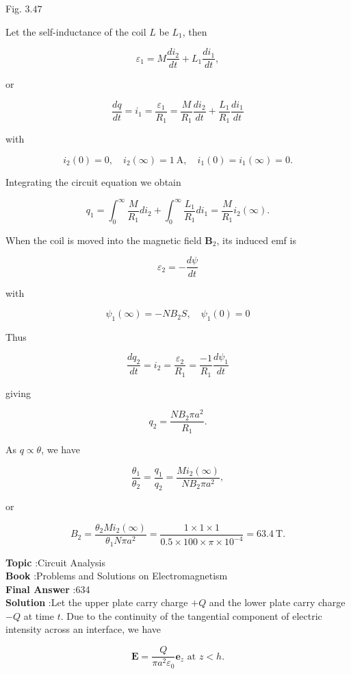 \documentclass[10pt]{article}
\begin{document}
Fig. $3.47$

Let the self-inductance of the coil $L$ be $L_{1}$, then

$$
\varepsilon_{1}=M \frac{d i_{2}}{d t}+L_{1} \frac{d i_{1}}{d t},
$$

or

$$
\frac{d q}{d t}=i_{1}=\frac{\varepsilon_{1}}{R_{1}}=\frac{M}{R_{1}} \frac{d i_{2}}{d t}+\frac{L_{1}}{R_{1}} \frac{d i_{1}}{d t}
$$

with

$$
i_{2}(0)=0, \quad i_{2}(\infty)=1 \mathrm{~A}, \quad i_{1}(0)=i_{1}(\infty)=0 .
$$

Integrating the circuit equation we obtain

$$
q_{1}=\int_{0}^{\infty} \frac{M}{R_{1}} d i_{2}+\int_{0}^{\infty} \frac{L_{1}}{R_{1}} d i_{1}=\frac{M}{R_{1}} i_{2}(\infty) .
$$

When the coil is moved into the magnetic field $\mathbf{B}_{2}$, its induced emf is

$$
\varepsilon_{2}=-\frac{d \psi}{d t}
$$

with

$$
\psi_{1}(\infty)=-N B_{2} S, \quad \psi_{1}(0)=0
$$

Thus

$$
\frac{d q_{2}}{d t}=i_{2}=\frac{\varepsilon_{2}}{R_{1}}=\frac{-1}{R_{1}} \frac{d \psi_{1}}{d t}
$$

giving

$$
q_{2}=\frac{N B_{2} \pi a^{2}}{R_{1}} .
$$

As $q \propto \theta$, we have

$$
\frac{\theta_{1}}{\theta_{2}}=\frac{q_{1}}{q_{2}}=\frac{M i_{2}(\infty)}{N B_{2} \pi a^{2}},
$$

or

$$
B_{2}=\frac{\theta_{2} M i_{2}(\infty)}{\theta_{1} N \pi a^{2}}=\frac{1 \times 1 \times 1}{0.5 \times 100 \times \pi \times 10^{-4}}=63.4 \mathrm{~T} .
$$

\textbf{Topic} :Circuit Analysis\\
\textbf{Book} :Problems and Solutions on Electromagnetism\\
\textbf{Final Answer} :634 \\


\textbf{Solution} :Let the upper plate carry charge $+Q$ and the lower plate carry charge $-Q$ at time $t$. Due to the continuity of the tangential component of electric intensity across an interface, we have

$$
\mathbf{E}=\frac{Q}{\pi a^{2} \varepsilon_{0}} \mathbf{e}_{z} \text { at } z<h .
$$
\end{document}
